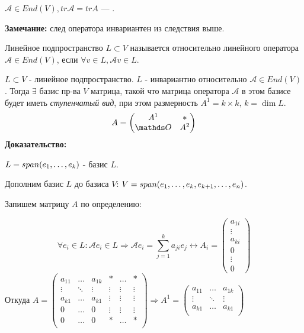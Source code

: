  $\mathcal{A} \in End(V), tr \mathcal{A} = tr A$ --- .

\textbf{Замечание:} след оператора инвариантен из следствия выше.

 Линейное подпространство $L \subset V$ называется  относительно линейного оператора $\mathcal{A}\in End(V)$, если $\forall v \in L, \mathcal{A} v \in L$.


$L \subset V$ - линейное подпространство. $L$ - инвариантно относительно $\mathcal{A} \in End(V)$. Тогда $ \exists $ базис пр-ва $V$ матрица, такой что матрица оператора $\mathcal{A}$ в этом базисе будет иметь \emph{ступенчатый вид}, при этом размерность $A^1 = k \times k,  \, k = \dim L$.
$$A =\begin{pmatrix}
    A^1 & *\\
    \zero & A^2
\end{pmatrix}$$
\textbf{Доказательство:}

$L = span (e_1,\ldots, e_k)$ - базис $L$.

Дополним базис $L$ до базиса $V$: $V = span (e_1,\ldots, e_k, e_{k+1},\ldots,e_n)$.

Запишем матрицу $A$ по определению:

$$\forall e_i\in L:\mathcal{A}e_i \in L  \Rightarrow \mathcal{A}e_i = \sum\limits_{j=1}^ka_{ji}e_j \leftrightarrow A_i = \begin{pmatrix}
    a_{1i}\\
    \vdots\\
    a_{ki}\\
    0\\
    \vdots\\0
\end{pmatrix}$$
Откуда $A = \begin{pmatrix}
    a_{11}&\ldots&a_{1k} & * & \ldots & *\\
    \vdots&\ddots & \vdots &\vdots& \vdots & \vdots\\
      a_{k1}&\ldots &  a_{k1} &\vdots& \vdots & \vdots\\
      0&\ldots &  0 &\vdots& \vdots & \vdots\\
        0&\ldots &  0 &*& \ldots & *\\
\end{pmatrix} \Rightarrow A^1 = \begin{pmatrix}
     a_{11}&\ldots&a_{1k}\\
     \vdots&\ddots & \vdots\\
     a_{k1}&\ldots &  a_{k1} \\
\end{pmatrix}$

